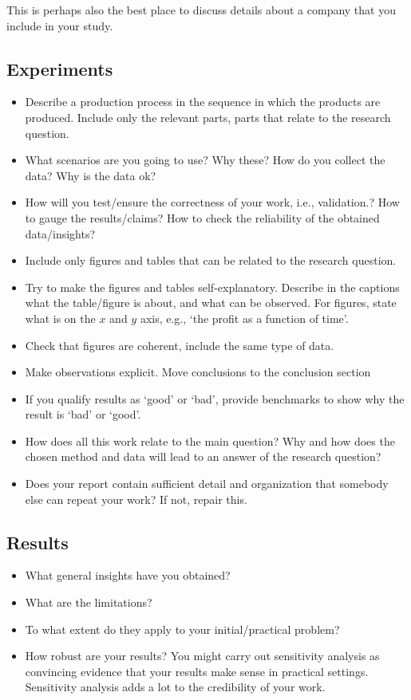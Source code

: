 \documentclass{article}
\begin{document}
This is  perhaps also the best place to discuss details about a company that you include in your study. 

\subsection{Experiments}
\label{sec:experiments}


\begin{itemize}
\item Describe a production process in the sequence in which the
  products are produced. Include only the relevant parts, parts that
  relate to the research question.
\item What scenarios are you going to use? Why these? How do you
  collect the data? Why is the data ok?
\item How will you test/ensure the correctness of your work, i.e.,
  validation.? How to gauge the results/claims? How to check the
  reliability of the obtained data/insights?
\item Include only figures and tables that can be related to the
  research question.
\item Try to make the figures and tables self-explanatory. Describe in
  the captions what the table/figure is about, and what can be
  observed. For figures, state what is on the $x$ and $y$ axis, e.g.,
  `the profit as a function of time'.
\item Check that figures are coherent, include the same type of data.
\item Make observations explicit.  Move conclusions to the conclusion section
\item If you qualify results as `good' or `bad', provide benchmarks to
  show why the result is `bad' or `good'.
\item How does all this work relate to the main question? Why and how
  does the chosen method and data will lead to an answer of the
  research question?
\item Does your report contain sufficient detail and organization that
  somebody else can repeat your work? If not, repair this.
\end{itemize}


\subsection{Results}
\label{sec:results}

\begin{itemize}
\item What general insights have  you obtained?
\item What are the limitations?
\item To what extent do they apply to your initial/practical problem?
\item How robust are your results? You might carry out sensitivity
  analysis as convincing evidence that your results make sense in
  practical settings. Sensitivity analysis adds a lot to the
  credibility of your work.
\end{itemize}
\end{document}
